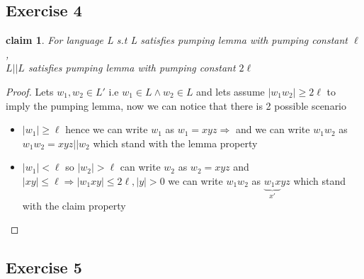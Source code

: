 \documentclass[12pt]{article}
\newtheorem{claim}[theorem]{claim}
\begin{document}
\subsection*{Exercise 4}
\begin{claim}
For language L s.t L satisfies pumping lemma with pumping constant $\ell$
, \\$L||L$ satisfies pumping lemma with pumping constant  $2\ell$
\end{claim}
\begin{proof} Lets $w_1,w_2\in L'$ i.e $w_1\in L \wedge w_2 \in L $ and lets assume $|w_1w_2|\geq 2\ell$ to imply the pumping lemma, now we can notice that there is 2 possible scenario  
\begin{itemize}
  \item $|w_1|\geq \ell$ hence we can write $w_1$ as $w_1=xyz  \Rightarrow$ and we can write $w_1w_2$ as $w_1w_2=xyz||w_2$ which stand with the lemma property  
  \item $|w_1|<\ell$ so $|w_2|>\ell$ can write $w_2$ as $w_2=xyz$ and $|xy|\leq\ell\Rightarrow |w_1xy|\leq 2\ell,|y|>0$  we can write $w_1w_2$ as $\underbrace{w_1x}_{x'}yz$ which stand with the claim property   
\end{itemize}
\end{proof}
\subsection*{Exercise 5}
\end{document}
